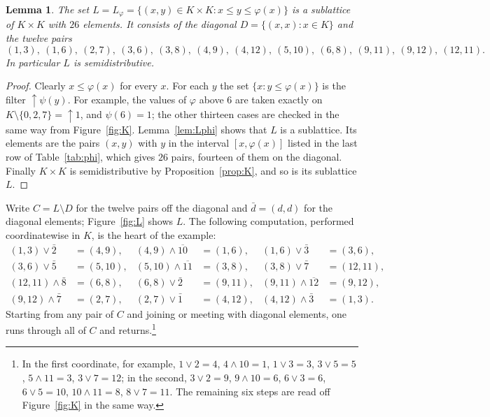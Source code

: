\documentclass[11pt]{amsart}
\newtheorem{lemma}[theorem]{Lemma}
\theoremstyle{definition}
\theoremstyle{remark}
\numberwithin{equation}{section}
\newcommand{\up}{{\uparrow}}
\begin{document}
\begin{lemma}\label{lem:L}
The set $L=L_\varphi=\{(x,y)\in K\times K: x\le y\le\varphi(x)\}$ is a sublattice of $K\times K$ with $26$ elements. It consists of the diagonal $D=\{(x,x):x\in K\}$ and the twelve pairs
\[
(1,3),\ (1,6),\ (2,7),\ (3,6),\ (3,8),\ (4,9),\ (4,12),\ (5,10),\ (6,8),\ (9,11),\ (9,12),\ (12,11).
\]
In particular $L$ is semidistributive.
\end{lemma}

\begin{proof}
Clearly $x\le\varphi(x)$ for every $x$. For each $y$ the set $\{x: y\le\varphi(x)\}$ is the filter $\up\psi(y)$. For example, the values of $\varphi$ above $6$ are taken exactly on $K\setminus\{0,2,7\}=\up1$, and $\psi(6)=1$; the other thirteen cases are checked in the same way from Figure~\ref{fig:K}. Lemma~\ref{lem:Lphi} shows that $L$ is a sublattice. Its elements are the pairs $(x,y)$ with $y$ in the interval $[x,\varphi(x)]$ listed in the last row of Table~\ref{tab:phi}, which gives $26$ pairs, fourteen of them on the diagonal. Finally $K\times K$ is semidistributive by Proposition~\ref{prop:K}, and so is its sublattice $L$.
\end{proof}

Write $C=L\setminus D$ for the twelve pairs off the diagonal and $\bar d=(d,d)$ for the diagonal elements; Figure~\ref{fig:L} shows $L$. The following computation, performed coordinatewise in $K$, is the heart of the example:
\begin{equation}\label{eq:cycle}
\begin{aligned}
(1,3)\vee\bar2&=(4,9), & (4,9)\wedge\overline{10}&=(1,6), & (1,6)\vee\bar3&=(3,6),\\
(3,6)\vee\bar5&=(5,10), & (5,10)\wedge\overline{11}&=(3,8), & (3,8)\vee\bar7&=(12,11),\\
(12,11)\wedge\bar8&=(6,8), & (6,8)\vee\bar2&=(9,11), & (9,11)\wedge\overline{12}&=(9,12),\\
(9,12)\wedge\bar7&=(2,7), & (2,7)\vee\bar1&=(4,12), & (4,12)\wedge\bar3&=(1,3).
\end{aligned}
\end{equation}
Starting from any pair of $C$ and joining or meeting with diagonal elements, one runs through all of $C$ and returns.\footnote{In the first coordinate, for example, $1\vee2=4$, $4\wedge10=1$, $1\vee3=3$, $3\vee5=5$, $5\wedge11=3$, $3\vee7=12$; in the second, $3\vee2=9$, $9\wedge10=6$, $6\vee3=6$, $6\vee5=10$, $10\wedge11=8$, $8\vee7=11$. The remaining six steps are read off Figure~\ref{fig:K} in the same way.}
\end{document}

